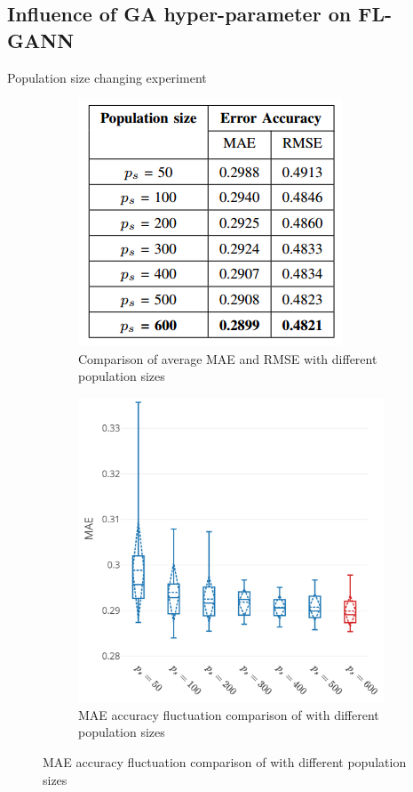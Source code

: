 \documentclass{beamer}
\newcommand{\notesize}{\fontsize{8}{10}\selectfont}
\begin{document}
	


\subsection{Influence of GA hyper-parameter on FL-GANN}
\begin{frame}{Population size changing experiment}
	\begin{figure}
		\centering
		\begin{subfigure}{0.4\textwidth}
			\centering
			\includegraphics[width=1.0\linewidth]{ps_changing.png}
			\caption*{\notesize Comparison of average MAE and RMSE with different population sizes}
			\label{fig:sub11}
		\end{subfigure}%
		\begin{subfigure}{.6\textwidth}
			\centering
			\includegraphics[width=0.8\linewidth]{tn2_multi_cpu_best_ps.pdf}
			\caption*{ \notesize MAE accuracy fluctuation comparison of with different population sizes}
			\label{fig:sub21}
		\end{subfigure}%
		\label{fig:cpu_predict}
	\end{figure}
\end{frame}
\end{document}

